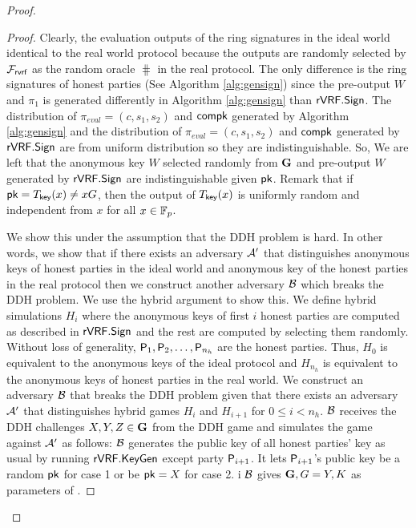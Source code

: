 \begin{proof}
		\begin{proof}
			Clearly, the evaluation outputs of the ring signatures in the ideal world identical to the real world protocol because  the outputs are randomly selected by $ \mathcal{F}_{\textsf{rvrf}} $ as the random oracle $ \hash $ in the real protocol. The only difference is the ring signatures of honest parties (See Algorithm \ref{alg:gensign}) since the pre-output $ W $ and $ \pi_1 $ is generated differently in Algorithm \ref{alg:gensign} than $ {\mathsf{rVRF}}.{\mathsf{Sign}} $. The distribution of $ \pi_{eval} = (c,s_1, s_2) $ and $ \mathsf{compk} $ generated by Algorithm \ref{alg:gensign} and the distribution of $ \pi_{eval} = (c,s_1, s_2) $ and $ \mathsf{compk} $ generated by $ {\mathsf{rVRF}}.{\mathsf{Sign}} $ are from uniform distribution so they are indistinguishable. So, We are left that the anonymous key $ W $ selected randomly from $ {\mathbf{G}} $ and pre-output $	 W $ generated by $ {\mathsf{rVRF}}.{\mathsf{Sign}} $ are indistinguishable given $ \mathsf{pk}  $. Remark that if  $ \mathsf{pk} = T_{\mathsf{key}}(x)  \neq x G$, then  the output of $ T_{\mathsf{key}}(x) $ is uniformly random and independent from $ x $ for all $ x \in \mathbb{F}_p $. 
			
			We  show this under the assumption that the DDH problem  is hard.  In other words, we show that if there exists an adversary $ \mathcal{A}' $ that distinguishes anonymous keys of honest parties in the ideal world and anonymous key of the honest parties in the real protocol then we construct another adversary $ \mathcal{B} $ which breaks the DDH problem. 
			We use the hybrid argument to show this.
			We define hybrid simulations $ H_{i} $ where  the anonymous keys of first $ i $ honest parties are computed as described in $ {\mathsf{rVRF}}.{\mathsf{Sign}} $ and the rest are computed by selecting them randomly. Without loss of generality, $ \mathsf{P}_1, \mathsf{P}_2, \ldots, \mathsf{P}_{n_h} $ are the honest parties. Thus, $ H_0 $ is equivalent to the anonymous keys of the ideal protocol  and $ H_{n_h}  $ is equivalent to the anonymous keys of honest parties in the real world.  We construct an adversary $ \mathcal{B} $ that breaks the DDH problem given that there exists an adversary $ \mathcal{A}' $ that distinguishes hybrid games $ H_i $ and $ H_{i + 1} $ for $ 0 \leq i < n_h $. $\mathcal{B} $ receives the DDH challenges $ X,Y, Z \in {\mathbf{G}} $ from the DDH game and simulates the game against $ \mathcal{A}' $ as follows: $\mathcal{B} $ generates the public key of all  honest parties' key as usual by running $ {\mathsf{rVRF}}.{\mathsf{KeyGen}}$ except party $ \mathsf{P}_{i+1} $. It lets $ \mathsf{P}_{i+1} $'s public key be a random $ \mathsf{pk}  $ for case 1 or be $ \mathsf{pk} = X $ for case 2.  i $ \mathcal{B} $ gives $ {\mathbf{G}}, G = Y, K $ as parameters of \name. 
			

\end{proof}
\end{proof}
